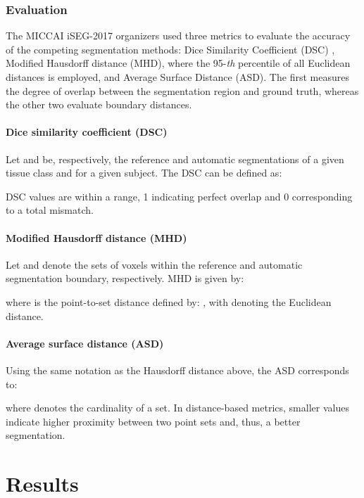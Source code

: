 \documentclass[twoside,espcrc2]{elsarticle}
\begin{document}
\subsubsection{Evaluation}
\label{sssec:evaluation}

The MICCAI iSEG-2017 organizers used three metrics to evaluate the accuracy of the competing segmentation methods: Dice Similarity Coefficient (DSC) \cite{dice1945measures}, Modified Hausdorff distance (MHD), where the 95-\textit{th} percentile of all Euclidean distances is employed, and Average Surface Distance (ASD). The first measures the degree of overlap between the segmentation region and ground truth, whereas the other two evaluate boundary distances. 

\paragraph{Dice similarity coefficient (DSC)}

Let  and  be, respectively, the reference and automatic segmentations of a given tissue class and for a given subject. The DSC can be defined as:

DSC values are within a  range, 1 indicating perfect overlap and 0 corresponding to a total mismatch.

\paragraph{Modified Hausdorff distance (MHD)}

Let  and  denote the sets of voxels within the reference and automatic segmentation boundary, respectively. MHD is given by:

where  is the point-to-set distance defined by: , with  denoting the Euclidean distance. 


\paragraph{Average surface distance (ASD)}

Using the same notation as the Hausdorff distance above, the ASD corresponds to:

where  denotes the cardinality of a set. 
In distance-based metrics, smaller values indicate higher proximity between two point sets and, thus, a better segmentation.

\section{Results}\label{sec:results}
\end{document}
